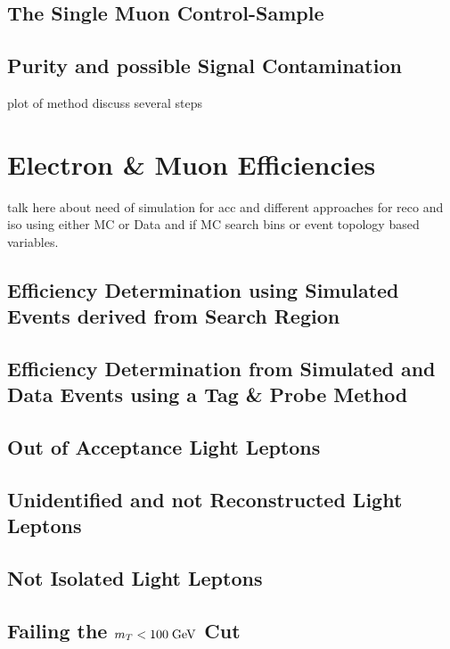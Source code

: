 \subsection{The Single Muon Control-Sample}
\subsection{Purity and possible Signal Contamination}

plot of method discuss several steps
\section{Electron \& Muon Efficiencies}
\todo talk here about need of simulation for acc and different approaches for reco and iso using either MC or Data and if MC search bins or event topology based variables.
\subsection{Efficiency Determination using Simulated Events derived from Search Region}
\label{sec:Lost_Lepton_8TeV_Efficiencies_Truth}
\subsection{Efficiency Determination from Simulated and Data Events using a Tag \& Probe Method}
\label{sec:Lost_Lepton_8TeV_Tag_Probe}

\subsection{Out of Acceptance Light Leptons}
\label{sec:Lost_Lepton_8TeV_Acc}

\subsection{Unidentified and not Reconstructed Light Leptons}
\label{sec:Lost_Lepton_8TeV_Reco}

\subsection{Not Isolated Light Leptons}
\label{sec:Lost_Lepton_8TeV_Iso}

\subsection{Failing the $m_{T}<100\;\text{Ge}\kern-0.06667em\text{V}$ Cut}
\label{sec:Lost_Lepton_8TeV_MTCut}

